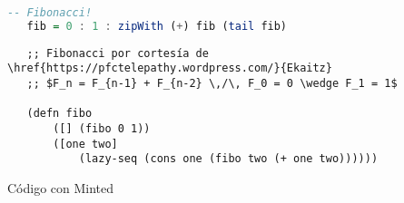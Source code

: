 \documentclass[a4paper,11pt]{article}
\begin{document}
  \listoflistings
  
  \begin{lstlisting}[language=haskell, caption=Código con Listings, captionpos=b]
   -- Fibonacci!
   fib = 0 : 1 : zipWith (+) fib (tail fib)
  \end{lstlisting}
  
  \begin{listing}
   \begin{verbatim}
   ;; Fibonacci por cortesía de \href{https://pfctelepathy.wordpress.com/}{Ekaitz}
   ;; $F_n = F_{n-1} + F_{n-2} \,/\, F_0 = 0 \wedge F_1 = 1$
   
   (defn fibo
       ([] (fibo 0 1))
       ([one two]
           (lazy-seq (cons one (fibo two (+ one two))))))
   \end{verbatim}
   \label{lst:fibo}
   \caption{Código con Minted}
  \end{listing}
  
\end{document}
